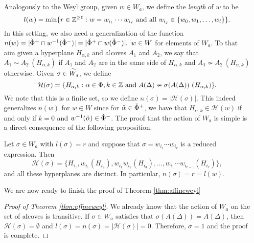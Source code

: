 Analogously to the Weyl group, given $w\in W_a$, we define the \textit{length} of $w$ to be 
$$l(w)=\min\{r\in\mathbb{Z}^{\geq0}:w=w_{i_1}\cdots w_{i_r}\text{ and all }w_{i_j}\in\{w_0,w_1,\ldots,w_l\}\}.$$
In this setting, we also need a generalization of the function $n(w)=|\check{\Phi}^+\cap w^{-1}(\check{\Phi}^-)|=|\check{\Phi}^+\cap w(\check{\Phi}^-)|,\ w\in W$ for elements of $W_a$. To that aim given a hyperplane $H_{\alpha,k}$ and alcoves $A_1$ and $A_2$, we say that $A_1\sim A_2\ (H_{\alpha,k})$ if $A_1$ and $A_2$ are in the same side of $H_{\alpha,k}$ and $A_1\nsim A_2\ (H_{\alpha,k})$ otherwise. Given $\sigma\in \widetilde{W_a}$, we define 
$$\mathcal{H}(\sigma)=\{H_{\alpha,k}:\alpha\in\Phi,k\in\mathbb{Z}\text{ and }A(\Delta)\nsim \sigma(A(\Delta))\ (H_{\alpha,k})\}.$$
We note that this is a finite set, so we define $n(\sigma)=|\mathcal{H}(\sigma)|$. This indeed generalizes $n(w)$ for $w\in W$ since for $\check{\alpha}\in\check{\Phi}^+$, we have that $H_{\alpha,k}\in\mathcal{H}(w)$ if and only if $k=0$ and $w^{-1}(\check{\alpha})\in\check{\Phi}^-$. The proof that the action of $W_a$ is simple is a direct consequence of the following proposition.

\begin{proposition}
    Let $\sigma\in W_a$ with $l(\sigma)=r$ and suppose that $\sigma=w_{i_1}\cdots w_{i_r}$ is a reduced expression. Then
    $$\mathcal{H}(\sigma)=\{H_{i_1},w_{i_1}(H_{i_2}),w_{i_1}w_{i_2}(H_{i_3}),\ldots,w_{i_1}\cdots w_{i_{r-1}}(H_{i_r})\},$$
    and all these hyperplanes are distinct. In particular, $n(\sigma)=r=l(w)$.
\end{proposition}

We are now ready to finish the proof of Theorem \ref{thm:affineweyl}

\begin{proof}[Proof of Theorem \ref{thm:affineweyl}]
    We already know that the action of $W_a$ on the set of alcoves is transitive. If $\sigma\in W_a$ satisfies that $\sigma(A(\Delta))=A(\Delta)$, then $\mathcal{H}(\sigma)=\emptyset$ and $l(\sigma)=n(\sigma)=|\mathcal{H}(\sigma)|=0$. Therefore, $\sigma=1$ and the proof is complete.
\end{proof}
































